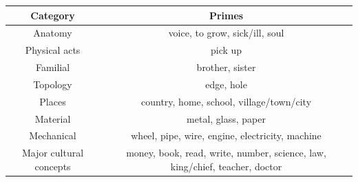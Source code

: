 \begin{tabular}{|c|c|}
\hline
\textbf{Category}& 
\textbf{Primes}\\ 
\hline
Anatomy& 
	

voice, to grow, sick/ill, soul\\ 

Physical acts& 
	

pick up\\ 

Familial& 
	

brother, sister\\ 

Topology& 
	

edge, hole\\ 

Places& 
	

country, home, school, village/town/city\\ 

Material& 
	

metal, glass, paper\\ 

Mechanical& 
	

wheel, pipe, wire, engine, electricity, machine\\ 

Major cultural concepts& 
	

money, book, read, write, number, science, law, king/chief, teacher, doctor\\ 

\hline
\end{tabular}
